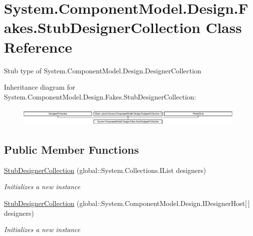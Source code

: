 \hypertarget{class_system_1_1_component_model_1_1_design_1_1_fakes_1_1_stub_designer_collection}{\section{System.\-Component\-Model.\-Design.\-Fakes.\-Stub\-Designer\-Collection Class Reference}
\label{class_system_1_1_component_model_1_1_design_1_1_fakes_1_1_stub_designer_collection}
}


Stub type of System.\-Component\-Model.\-Design.\-Designer\-Collection 


Inheritance diagram for System.\-Component\-Model.\-Design.\-Fakes.\-Stub\-Designer\-Collection\-:\begin{figure}[H]
\begin{center}
\leavevmode
\includegraphics[height=0.919540cm]{class_system_1_1_component_model_1_1_design_1_1_fakes_1_1_stub_designer_collection}
\end{center}
\end{figure}
\subsection*{Public Member Functions}
\begin{DoxyCompactItemize}
\item 
\hyperlink{class_system_1_1_component_model_1_1_design_1_1_fakes_1_1_stub_designer_collection_a2cc17a717be4c34ea932b88147dccb83}{Stub\-Designer\-Collection} (global\-::\-System.\-Collections.\-I\-List designers)
\begin{DoxyCompactList}\small\item\em Initializes a new instance\end{DoxyCompactList}\item 
\hyperlink{class_system_1_1_component_model_1_1_design_1_1_fakes_1_1_stub_designer_collection_a4fe379a8d022b377e8b304c31617c6a3}{Stub\-Designer\-Collection} (global\-::\-System.\-Component\-Model.\-Design.\-I\-Designer\-Host\mbox{[}$\,$\mbox{]} designers)
\begin{DoxyCompactList}\small\item\em Initializes a new instance\end{DoxyCompactList}\end{DoxyCompactItemize}
